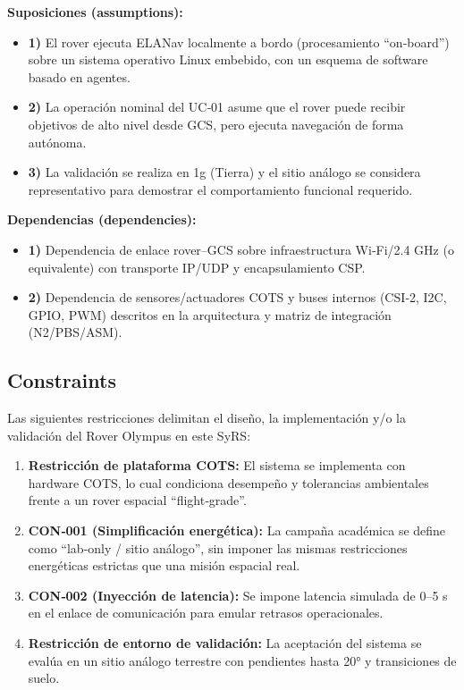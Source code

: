 \textbf{Suposiciones (assumptions):}
\begin{itemize}
    \item \textbf{1)} El rover ejecuta ELANav localmente a bordo (procesamiento ``on‑board'') sobre un sistema operativo Linux embebido, con un esquema de software basado en agentes. \cite{nasa_cm, segoldmine_ppi, omg_sysml_mbse}  
    \item \textbf{2)} La operación nominal del UC‑01 asume que el rover puede recibir objetivos de alto nivel desde GCS, pero ejecuta navegación de forma autónoma. \cite{segoldmine_ppi, nasa_cm, omg_sysml_mbse}  
    \item \textbf{3)} La validación se realiza en 1g (Tierra) y el sitio análogo se considera representativo para demostrar el comportamiento funcional requerido. \cite{nasa_cm, segoldmine_ppi, omg_sysml_mbse}  
\end{itemize}

\textbf{Dependencias (dependencies):}
\begin{itemize}
    \item \textbf{1)} Dependencia de enlace rover–GCS sobre infraestructura Wi‑Fi/2.4 GHz (o equivalente) con transporte IP/UDP y encapsulamiento CSP. \cite{nasa_cm, segoldmine_ppi, omg_sysml_mbse}  
    \item \textbf{2)} Dependencia de sensores/actuadores COTS y buses internos (CSI‑2, I2C, GPIO, PWM) descritos en la arquitectura y matriz de integración (N2/PBS/ASM). \cite{segoldmine_ppi, nasa_cm, omg_sysml_mbse} 
\end{itemize}

\subsection{Constraints}\label{subsec:constraints}

Las siguientes restricciones delimitan el diseño, la implementación y/o la validación del Rover Olympus en este SyRS:

\begin{enumerate}
    \item \textbf{Restricción de plataforma COTS:} El sistema se implementa con hardware COTS, lo cual condiciona desempeño y tolerancias ambientales frente a un rover espacial ``flight‑grade''. \cite{nasa_cm, segoldmine_ppi, omg_sysml_mbse}  
    \item \textbf{CON‑001 (Simplificación energética):} La campaña académica se define como ``lab‑only / sitio análogo'', sin imponer las mismas restricciones energéticas estrictas que una misión espacial real. \cite{nasa_cm, segoldmine_ppi}  
    \item \textbf{CON‑002 (Inyección de latencia):} Se impone latencia simulada de 0–5 s en el enlace de comunicación para emular retrasos operacionales. \cite{nasa_cm, segoldmine_ppi}  
    \item \textbf{Restricción de entorno de validación:} La aceptación del sistema se evalúa en un sitio análogo terrestre con pendientes hasta 20° y transiciones de suelo. \cite{nasa_cm, segoldmine_ppi, omg_sysml_mbse} 
\end{enumerate}
